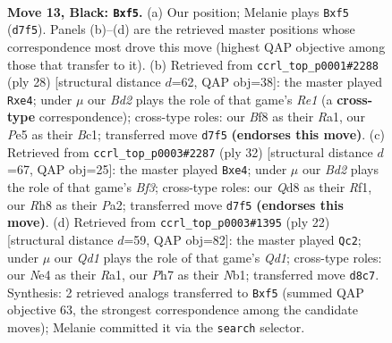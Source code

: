 \documentclass[11pt]{article}
\begin{document}
\clearpage

\begin{figure}[p]\centering
\begin{subfigure}{0.46\textwidth}\centering
\resizebox{\linewidth}{!}{%
\newchessgame
\chessboard[
  setfen={r2qkb1r/pp1b2pp/5p2/4pN1P/P1P1n1P1/8/1P3P2/R1BQKB1R b KQkq - 1 13},
  showmover=false,
  pgfstyle=straightmove, color=movearrow, markmove={d7-f5}
]}
\caption{}
\end{subfigure}\hfill
\begin{subfigure}{0.46\textwidth}\centering
\resizebox{\linewidth}{!}{%
\newchessgame
\chessboard[
  setfen={r1b2rk1/p3qpp1/2pbp2p/8/3Pn3/1B6/PP3PPP/R1BQR1K1 w - - 0 15},
  showmover=false,
  pgfstyle=straightmove, color=movearrow, markmove={e1-e4}
]}
\caption{}
\end{subfigure}
\\[4pt]
\begin{subfigure}{0.46\textwidth}\centering
\resizebox{\linewidth}{!}{%
\newchessgame
\chessboard[
  setfen={r1bqr1k1/ppp2pbp/3p4/8/3PnB1P/3N1B2/P1PQ2P1/R4RK1 w - - 2 17},
  showmover=false,
  pgfstyle=straightmove, color=movearrow, markmove={f3-e4}
]}
\caption{}
\end{subfigure}\hfill
\begin{subfigure}{0.46\textwidth}\centering
\resizebox{\linewidth}{!}{%
\newchessgame
\chessboard[
  setfen={r2qkb1r/1pp2ppp/4b3/pP6/2nB4/P3P3/5PPP/RN1QKB1R w KQkq - 1 12},
  showmover=false,
  pgfstyle=straightmove, color=movearrow, markmove={d1-c2}
]}
\caption{}
\end{subfigure}
\caption{\textbf{Move 13, Black: \texttt{Bxf5}.} (a) Our position; Melanie plays \texttt{Bxf5} (\texttt{d7f5}). Panels (b)--(d) are the retrieved master positions whose correspondence most drove this move (highest QAP objective among those that transfer to it). (b) Retrieved from \texttt{ccrl\_top\_p0001\#2288} (ply 28) [structural distance $d$=62, QAP obj=38]: the master played \texttt{Rxe4}; under $\mu$ our \emph{Bd2} plays the role of that game's \emph{Re1} (a \textbf{cross-type} correspondence); cross-type roles: our \emph{B}f8 as their \emph{R}a1, our \emph{P}e5 as their \emph{B}c1; transferred move \texttt{d7f5} \textbf{(endorses this move)}. (c) Retrieved from \texttt{ccrl\_top\_p0003\#2287} (ply 32) [structural distance $d$=67, QAP obj=25]: the master played \texttt{Bxe4}; under $\mu$ our \emph{Bd2} plays the role of that game's \emph{Bf3}; cross-type roles: our \emph{Q}d8 as their \emph{R}f1, our \emph{R}h8 as their \emph{P}a2; transferred move \texttt{d7f5} \textbf{(endorses this move)}. (d) Retrieved from \texttt{ccrl\_top\_p0003\#1395} (ply 22) [structural distance $d$=59, QAP obj=82]: the master played \texttt{Qc2}; under $\mu$ our \emph{Qd1} plays the role of that game's \emph{Qd1}; cross-type roles: our \emph{N}e4 as their \emph{R}a1, our \emph{P}h7 as their \emph{N}b1; transferred move \texttt{d8c7}. Synthesis: 2 retrieved analogs transferred to \texttt{Bxf5} (summed QAP objective 63, the strongest correspondence among the candidate moves); Melanie committed it via the \texttt{search} selector.}
\label{fig:thought-m25}
\end{figure}
\end{document}
